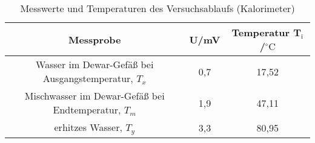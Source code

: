 \begin{table}[h]
	\begin{center}
		\begin{tabular}{ccc}
			Messprobe & U/mV & Temperatur T$_\text{i}$/$^{\circ}\mathrm{C}$\\ \hline
			Wasser im Dewar-Gefäß bei Ausgangstemperatur, $T_x$& 0,7 & 17,52\\
			Mischwasser im Dewar-Gefäß bei Endtemperatur, $T_m$&1,9&47,11\\
			erhitzes Wasser, $T_y$&3,3&80,95
		\end{tabular}
		\caption{Messwerte und Temperaturen des Versuchsablaufs (Kalorimeter)}
		\label{taba1}
	\end{center}
\end{table}